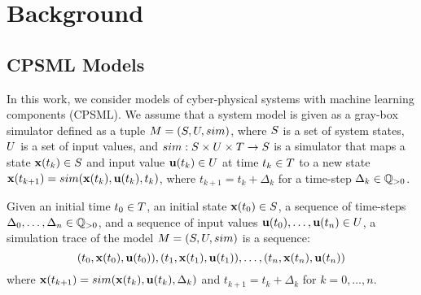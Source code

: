 \section{Background}
\label{sec:background}

\subsection{CPSML Models}
\label{sec:cps}

In this work, we consider models of cyber-physical systems with machine learning components (CPSML).
We assume that a system model is given as a gray-box simulator defined as a tuple $M= (S, U, sim)$,
where $S$ is a set of system states, $U$ is a set of input values, and
$sim: S \times U \times T  \to S$ is a simulator that maps 
a state $\mathbf{x}(t_k) \in S$ and input value $\mathbf{u}(t_k) \in U$ at time $t_k \in T$ to a new 
state $\mathbf{x}(t_{k+1}) = sim(\mathbf{x}(t_k), \mathbf{u}(t_k),t_k)$, where $t_{k+1} = t_k + \Delta_k$ for a 
time-step $\Delta_k \in \mathbb{Q}_{> 0}$.

Given an initial time $t_0 \in T$, an initial state $\mathbf{x}(t_0) \in S$, a sequence of time-steps
$\Delta_0, \dots, \Delta_n \in \mathbb{Q}_{> 0}$, and a sequence of input values $\mathbf{u}(t_0), \dots, \mathbf{u}(t_n) \in U$,
a simulation trace of the model $M= (S, U, sim)$ is a sequence:
$$(t_0,\mathbf{x}(t_0),\mathbf{u}(t_0)),(t_1,\mathbf{x}(t_1),\mathbf{u}(t_1)), \dots, (t_n,\mathbf{x}(t_n),\mathbf{u}(t_n))$$
where $\mathbf{x}(t_{k+1}) = sim(\mathbf{x}(t_k),\mathbf{u}(t_k),\Delta_k)$ and $t_{k+1} = t_{k} + \Delta_k$ for $k = 0,\dots, n$.

